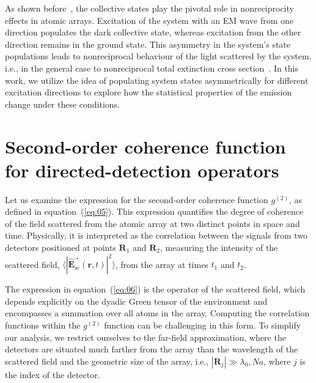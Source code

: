 \documentclass[aps,prl,twocolumn,superscriptaddress,showpacs,amsmath,amssymb]{revtex4-2}
\begin{document}
As shown before~\cite{muller2017nonreciprocal,hamann2018nonreciprocity, guimond_subradiant_2019, nefedkin2022dark}, the collective states play the pivotal role in nonreciprocity effects in atomic arrays.
Excitation of the system with an EM wave from one direction populates the dark collective state, whereas excitation from the other direction remains in the ground state. 
This asymmetry in the system's state populations leads to nonreciprocal behaviour of the light scattered by the system, i.e., in the general case to nonreciprocal total extinction cross section~\cite{nefedkin2023nonreciprocal}. 
In this work, we utilize the idea of populating system states asymmetrically for different excitation directions to explore how the statistical properties of the emission change under these conditions.


\section{Second-order coherence function for directed-detection operators}

Let us examine the expression for the second-order coherence function $g^{(2)}$, as defined in equation~(\ref{eq:05}). 
This expression quantifies the degree of coherence of the field scattered from the atomic array at two distinct points in space and time. 
Physically, it is interpreted as the correlation between the signals from two detectors positioned at points $\mathbf{R}_1$ and $\mathbf{R}_2$, measuring the intensity of the scattered field, $\langle |\hat{\mathbf{E}}^+_\mathrm{sc}(\mathbf{r}, t)|^2 \rangle$, from the array at times $t_1$ and $t_2$.

The expression in equation~(\ref{eq:06}) is the operator of the scattered field, which depends explicitly on the dyadic Green tensor of the environment and encompasses a summation over all atoms in the array. 
Computing the correlation functions within the $g^{(2)}$ function can be challenging in this form. 
To simplify our analysis, we restrict ourselves to the far-field approximation, where the detectors are situated much farther from the array than the wavelength of the scattered field and the geometric size of the array, i.e., $ |\mathbf{R}_j| \gg \lambda_0, N a$, where $j$ is the index of the detector.
\end{document}
